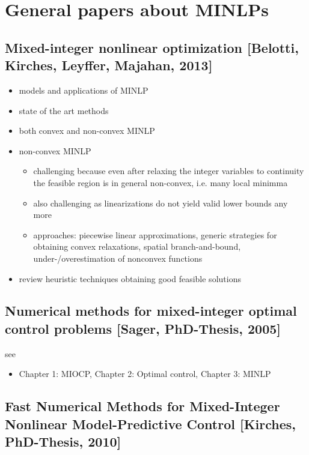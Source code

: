 \documentclass{article}
\begin{document}
\newpage
\section{General papers about MINLPs}
\subsection{Mixed-integer nonlinear optimization [Belotti, Kirches, Leyffer, Majahan, 2013]}
\begin{itemize}
\item models and applications of MINLP
\item state of the art methods
\item both convex and non-convex MINLP
\item non-convex MINLP
\begin{itemize}
\item challenging because even after relaxing the integer variables to continuity the feasible region is in general non-convex, i.e. many local minimma
\item also challenging as linearizations do not yield valid lower bounds any more
\item approaches: piecewise linear approximations, generic strategies for obtaining convex relaxations, spatial branch-and-bound, under-/overestimation of nonconvex functions
\end{itemize}
\item review heuristic techniques obtaining good feasible solutions
\end{itemize}
\subsection{Numerical methods for mixed-integer optimal control problems [Sager, PhD-Thesis, 2005]}
see \cite{sager2005numerical}
\begin{itemize}
\item Chapter 1: MIOCP, Chapter 2: Optimal control, Chapter 3: MINLP
\end{itemize}
\subsection{Fast Numerical Methods for Mixed-Integer Nonlinear Model-Predictive Control [Kirches, PhD-Thesis, 2010]}
\end{document}
